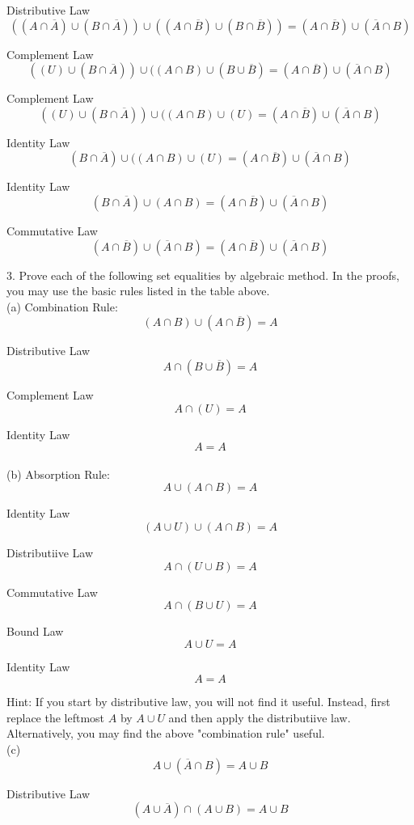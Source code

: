 \documentclass[10pt]{article}
\begin{document}
Distributive Law
$$((A \cap \overline{A}) \cup (B \cap \overline{A})) \cup ((A \cap \overline{B}) \cup (B \cap \overline{B})) = (A \cap \overline{B}) \cup (\overline{A} \cap B)$$

Complement Law
$$((U) \cup (B \cap \overline{A})) \cup ((A \cap B) \cup (B \cup \overline{B}) = (A \cap \overline{B}) \cup (\overline{A} \cap B)$$

Complement Law
$$((U) \cup (B \cap \overline{A})) \cup ((A \cap B) \cup (U) = (A \cap \overline{B}) \cup (\overline{A} \cap B)$$

Identity Law
$$(B \cap \overline{A}) \cup ((A \cap B) \cup (U) = (A \cap \overline{B}) \cup (\overline{A} \cap B)$$

Identity Law
$$(B \cap \overline{A}) \cup (A \cap B) = (A \cap \overline{B}) \cup (\overline{A} \cap B)$$

Commutative Law  
$$(A \cap \overline{B}) \cup (\overline{A} \cap B) = (A \cap \overline{B}) \cup (\overline{A} \cap B)$$

3. Prove each of the following set equalities by algebraic method.  In the proofs, you may use the basic rules listed in the table above.\\

(a) Combination Rule:
$$(A \cap B) \cup (A \cap \overline{B}) = A$$

Distributive Law
$$A \cap (B \cup \overline{B}) = A$$

Complement Law
$$A \cap (U) = A$$

Identity Law
$$A = A$$\\

(b) Absorption Rule:
$$ A \cup (A \cap B) = A$$

Identity Law
$$(A \cup U) \cup (A \cap B) = A$$

Distributiive Law
$$A \cap (U \cup B) = A$$

Commutative Law
$$A \cap(B \cup U) = A$$

Bound Law
$$A \cup U = A$$

Identity Law
$$A = A$$

Hint: If you start by distributive law, you will not find it useful.  Instead, first replace the leftmost $A$ by $A \cup U$ and then apply the distributiive law.  Alternatively, you may find the above "combination rule" useful.\\

(c)
$$A \cup (\overline{A} \cap B) = A \cup B$$

Distributive Law
$$(A \cup \overline{A}) \cap (A \cup B) = A \cup B$$
\end{document}
